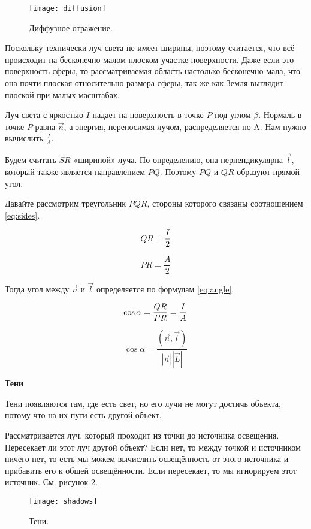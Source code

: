 \begin{figure}[H]
	\centering
	\texttt{[image: diffusion]}
	\caption{Диффузное отражение. }
	\label{img:diffusion}
\end{figure}

Поскольку технически луч света не имеет ширины, поэтому считается, что всё происходит на бесконечно малом плоском участке поверхности. Даже если это поверхность сферы, то рассматриваемая область настолько бесконечно мала, что она почти плоская относительно размера сферы, так же как Земля выглядит плоской при малых масштабах.

Луч света с яркостью $I$ падает на поверхность в точке $P$ под углом  $\beta$. Нормаль в точке $P$ равна $\vec n$, а энергия, переносимая лучом, распределяется по A. Нам нужно вычислить $\frac{I}{A}$.

Будем считать $SR$ «шириной» луча. По определению, она перпендикулярна $\vec l$, который также является направлением $PQ$. Поэтому $PQ$ и $QR$ образуют прямой угол. 

Давайте рассмотрим треугольник $PQR$, стороны которого связаны соотношением \ref{eq:sides}. 

\begin{equation}
	\centering
	QR = \frac{I}{2}
	\label{eq:sides}
\end{equation}

	$$PR = \frac{A}{2}$$

Тогда угол между $\vec n$ и $\vec l$ определяется по формулам \ref{eq:angle}. 

\begin{equation}
	\centering
	\cos{\alpha} = \frac{QR}{PR} = \frac{I}{A}
 	\label{eq:angle}
\end{equation}

$$\cos{\alpha} = \frac{(\vec n, \vec l)}{|\vec n||\vec L|}$$

\textbf{Тени}

Тени появляются там, где есть свет, но его лучи не могут достичь объекта, потому что на их пути есть другой объект.

Рассматривается луч, который проходит из точки до источника освещения. Пересекает ли этот луч другой объект? Если нет, то между точкой и источником ничего нет, то есть мы можем вычислить освещённость от этого источника и прибавить его к общей освещённости. Если пересекает, то мы игнорируем этот источник. См. рисунок \ref{img:shadows}. 

\begin{figure}[H]
	\centering
	\texttt{[image: shadows]}
	\caption{Тени. }
	\label{img:shadows}
\end{figure}

